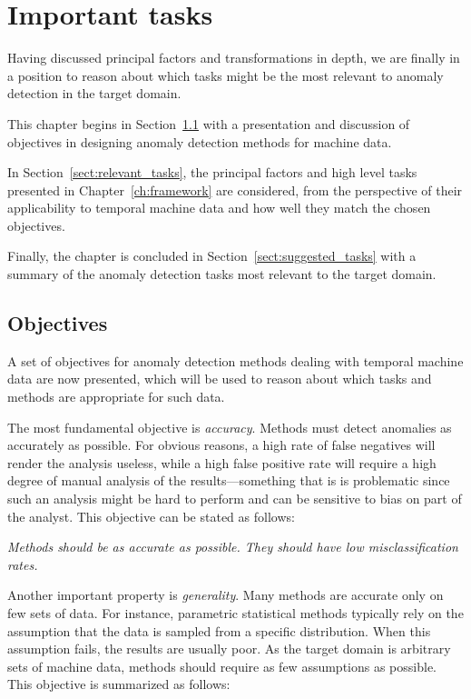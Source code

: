 \chapter{Important tasks}
\label{ch:problems}

Having discussed principal factors and transformations in depth, we are finally in a position to reason about which tasks might be the most relevant to anomaly detection in the target domain.

This chapter begins in Section~\ref{sect:goals} with a presentation and discussion of objectives in designing anomaly detection methods for machine data.

In Section~\ref{sect:relevant_tasks}, the principal factors and high level tasks presented in Chapter~\ref{ch:framework} are considered, from the perspective of their applicability to temporal machine data and how well they match the chosen objectives.

Finally, the chapter is concluded in Section~\ref{sect:suggested_tasks} with a summary of the anomaly detection tasks most relevant to the target domain.

\section{Objectives}
\label{sect:goals}

A set of objectives for anomaly detection methods dealing with temporal machine data are now presented, which will be used to reason about which tasks and methods are appropriate for such data.

The most fundamental objective is \emph{accuracy}. Methods must detect anomalies as accurately as possible. For obvious reasons, a high rate of false negatives will render the analysis useless, while a high false positive rate will require a high degree of manual analysis of the results---something that is is problematic since such an analysis might be hard to perform and can be sensitive to bias on part of the analyst. This objective can be stated as follows:

  \emph{Methods should be as accurate as possible. They should have low misclassification rates.}

Another important property is \emph{generality}. Many methods are accurate only on few sets of data. For instance, parametric statistical methods typically rely on the assumption that the data is sampled from a specific distribution. When this assumption fails, the results are usually poor. As the target domain is arbitrary sets of machine data, methods should require as few assumptions as possible. This objective is summarized as follows:

